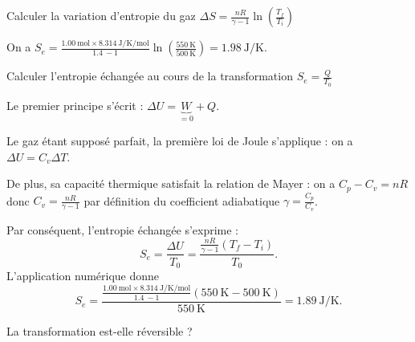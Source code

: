 \begin{enonce}
	Calculer la variation d'entropie du gaz $\Delta S=\frac{nR}{\gamma -1} \ln \left( \frac{T_f}{T_i}  \right)$
\end{enonce}
 
 
\begin{corrige}
On a $S_e=\frac{ \SI{1,00}{\mol} \times \SI{8,314}{\joule\per\kelvin\per\mole}
 }{\SI{1,4}{} -1} \ln \left( \frac{ \SI{550}{\kelvin} }{ \SI{500}{\kelvin}  } \right) = \SI{1,98}{\joule\per\kelvin}$.
\end{corrige}




\begin{enonce}
	Calculer l'entropie échangée au cours de la transformation $S_e=\frac{Q}{T_0}$
\end{enonce}
 
 
\begin{corrige}
Le premier principe s'écrit : $\Delta U = \underbrace{W}_{=0} {}+{} Q$.

Le gaz étant supposé parfait, la première loi de Joule s'applique : on a $\Delta U = C_v \Delta T$. 

De plus, sa capacité thermique satisfait la relation de Mayer : on a $C_p - C_v = nR$ donc $C_v=\frac{nR}{\gamma -1}$ par définition du coefficient adiabatique $\gamma = \frac{C_p}{C_v}$.
 
Par conséquent, l'entropie échangée s'exprime : 
\[
S_e=\frac{\Delta U}{T_0}=\frac{\frac{nR}{\gamma-1}\left(T_f-T_i\right)}{T_0}.
\]
L'application numérique donne 
\[
S_e=\frac{\displaystyle\frac{ \SI{1,00}{\mol} \times \SI{8,314}{\joule\per\kelvin\per\mole} }{\SI{1,4}{}-1}\left( \SI{550}{\kelvin} - \SI{500}{\kelvin} \right)}{ \SI{550}{\kelvin} }=\SI{1,89}{\joule\per\kelvin}.
\]
\end{corrige}

 
 

\begin{enonce}
	La transformation est-elle réversible ?
\end{enonce}
 
